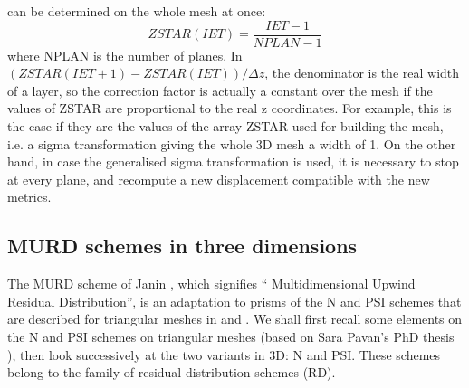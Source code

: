 can be determined on the whole mesh at once:
\begin{equation}
ZSTAR(IET)=\dfrac{IET-1}{NPLAN-1}%
\end{equation}
where NPLAN is the number of planes. In $(ZSTAR(IET+1)-ZSTAR(IET))/\Delta z$, the denominator is the real width
of a layer, so the correction factor is actually a constant over the mesh if the values of ZSTAR are proportional to
the real z coordinates. For example, this is the case if they are the values of the array ZSTAR
used for building the mesh, i.e. a sigma transformation giving the whole 3D
mesh a width of 1.
On the other hand, in case the
generalised sigma transformation is used, it is necessary to stop at every plane, and recompute a new
displacement compatible with the new metrics.


\subsection{\label{schema murd en dimension 3}MURD schemes in three dimensions%
%
}

The MURD scheme of Janin \cite{janin95}, which signifies \textquotedblleft
Multidimensional Upwind Residual Distribution\textquotedblright, is an
adaptation to prisms of the N and PSI schemes that are described for triangular meshes in \cite{hervouet007} and \cite{Pavan2016}.
We shall first recall some elements on the N and PSI schemes on triangular meshes (based on Sara Pavan's PhD thesis \cite{Pavan2016}),
then look successively at the two variants in 3D: N and PSI. These schemes belong to the family of residual distribution schemes (RD).

